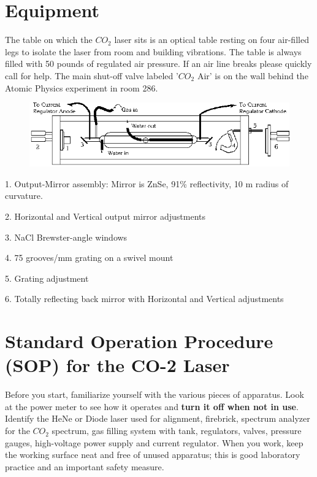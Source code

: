 \documentclass{../lab}
\begin{document}
\section{Equipment}

The table on which the $CO_2 $ laser sits is an optical table resting on four air-filled legs to isolate the laser from room and building vibrations. The table is always filled with 50 pounds of regulated air pressure. If an air line breaks please quickly call for help. The main shut-off valve labeled '$CO_2 $ Air' is on the wall behind the Atomic Physics experiment in room 286.


\begin{figure}[h]
    \centering
    \href{http://experimentationlab.berkeley.edu/sites/default/files/images/CO23.gif}{\includegraphics[width=\linewidth]{images/CO23.png}}
    \caption{}
    \label{fig:CO23}
\end{figure}

1. Output-Mirror assembly: Mirror is ZnSe, 91\% reflectivity, 10 m radius of curvature.

2. Horizontal and Vertical output mirror adjustments

3. NaCl Brewster-angle windows

4. 75 grooves/mm grating on a swivel mount

5. Grating adjustment

6. Totally reflecting back mirror with Horizontal and Vertical adjustments

\section{Standard Operation Procedure (SOP) for the CO-2 Laser}

Before you start, familiarize yourself with the various pieces of apparatus. Look at the power meter to see how it operates and \textbf{turn it off when not in use}. Identify the HeNe or Diode laser used for alignment, firebrick, spectrum analyzer for the $CO_2 $ spectrum, gas filling system with tank, regulators, valves, pressure gauges, high-voltage power supply and current regulator. When you work, keep the working surface neat and free of unused apparatus; this is good laboratory practice and an important safety measure.
\end{document}
